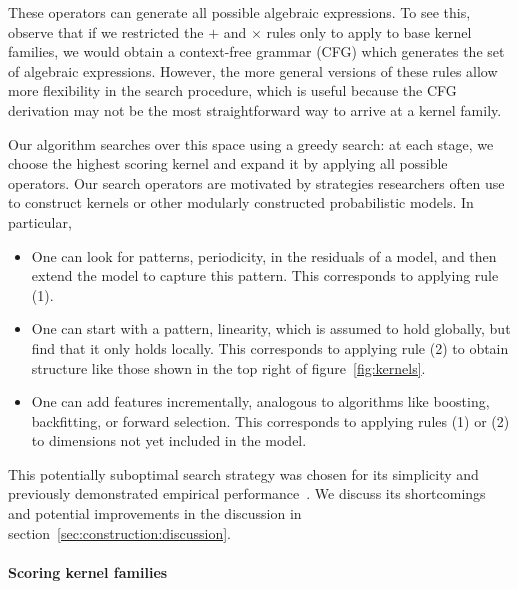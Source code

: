 These operators can generate all possible algebraic expressions.
To see this, observe that if we restricted the $+$ and $\times$ rules only to apply to base kernel families, we would obtain a context-free grammar (CFG) which generates the set of algebraic expressions.
However, the more general versions of these rules allow more flexibility in the search procedure, which is useful because the CFG derivation may not be the most straightforward way to arrive at a kernel family.

Our algorithm searches over this space using a greedy search: at each stage, we choose the highest scoring kernel and expand it by applying all possible operators.
Our search operators are motivated by strategies researchers often use to construct kernels or other modularly constructed probabilistic models.
In particular,
\begin{itemize}
\item One can look for patterns, \eg periodicity, in the residuals of a model, and then extend the model to capture this pattern.
This corresponds to applying rule (1).
\item One can start with a pattern, \eg linearity, which is assumed to hold globally, but find that it only holds locally.
This corresponds to applying rule (2) to obtain structure like those shown in the top right of figure~\ref{fig:kernels}.
\item One can add features incrementally, analogous to algorithms like boosting, backfitting, or forward selection.
This corresponds to applying rules (1) or (2) to dimensions not yet included in the model.
\end{itemize}

This potentially suboptimal search strategy was chosen for its simplicity and previously demonstrated empirical performance~\citep{Grosse2012-zi}.
We discuss its shortcomings and potential improvements in the discussion in section~\ref{sec:construction:discussion}.

\paragraph{Scoring kernel families}

